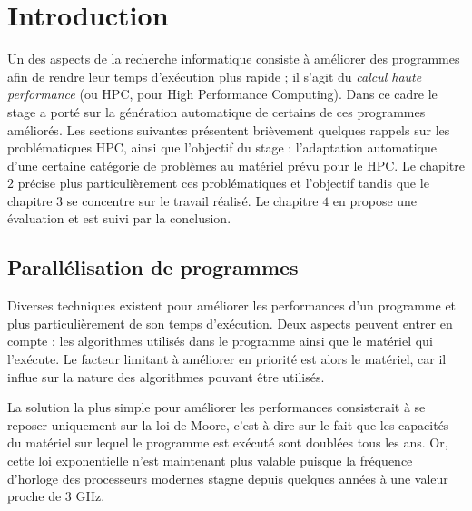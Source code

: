 
\chapter{Introduction}

Un des aspects de la recherche informatique consiste à améliorer des programmes afin de rendre leur temps d'exécution plus rapide ; il s'agit du \emph{calcul haute performance} (ou HPC, pour High Performance Computing). 
Dans ce cadre le stage a porté sur la génération automatique de certains de ces programmes améliorés. 
Les sections suivantes présentent brièvement quelques rappels sur les problématiques HPC, ainsi que l'objectif du stage : l'adaptation automatique d'une certaine catégorie de problèmes au matériel prévu pour le HPC. Le chapitre $2$ précise plus particulièrement ces problématiques et l'objectif tandis que le chapitre $3$ se concentre sur le travail réalisé. Le chapitre $4$ en propose une évaluation et est suivi par la conclusion. 


\section{Parallélisation de programmes}

Diverses techniques existent pour améliorer les performances d'un programme et plus particulièrement de son temps d'exécution. Deux aspects peuvent entrer en compte : les algorithmes utilisés dans le programme ainsi que le matériel qui l'exécute. Le facteur limitant à améliorer en priorité est alors le matériel, car il influe sur la nature des algorithmes pouvant être utilisés.

La solution la plus simple pour améliorer les performances consisterait à se reposer uniquement sur la loi de Moore, c'est-à-dire sur le fait que les capacités du matériel sur lequel le programme est exécuté sont doublées tous les ans. Or, cette loi exponentielle n'est maintenant plus valable puisque la fréquence d'horloge des processeurs modernes stagne depuis quelques années à une valeur proche de $3$ GHz. 

